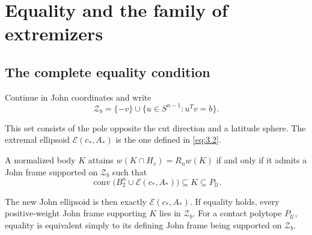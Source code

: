 \section{Equality and the family of extremizers}\label{sec:5}

\subsection{The complete equality condition}\label{sec:5.1}

Continue in John coordinates and write
\begin{equation}\label{eq:5.1}
\mathcal Z_b=\{-v\}\cup\{u\in S^{n-1}:u^Tv=b\}.
\end{equation}

This set consists of the pole opposite the cut direction and a latitude sphere. The extremal ellipsoid $\mathcal E(c_*,A_*)$ is the one defined in \eqref{eq:3.2}.

\begin{theorem}\label{thm-equality}
A normalized body $K$ attains $w(K\cap H_v)=R_nw(K)$ if and only if it admits a John frame supported on $\mathcal Z_b$ such that
\begin{equation}\label{eq:5.2}
\operatorname{conv}\bigl(B_2^n\cup\mathcal E(c_*,A_*)\bigr)
\subseteq K\subseteq P_{\mathcal U}.
\end{equation}

The new John ellipsoid is then exactly $\mathcal E(c_*,A_*)$. If equality holds, every positive-weight John frame supporting $K$ lies in $\mathcal Z_b$. For a contact polytope $P_{\mathcal U}$, equality is equivalent simply to its defining John frame being supported on $\mathcal Z_b$.

\end{theorem}

